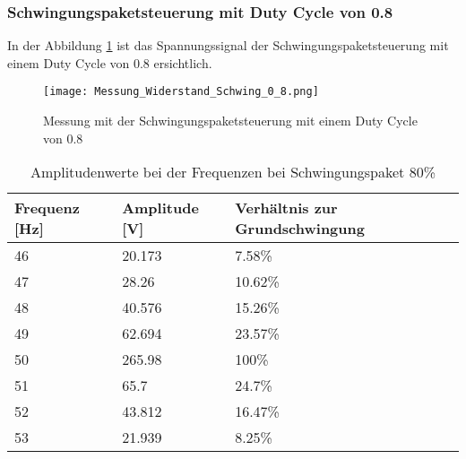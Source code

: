 \newpage
\subsubsection*{Schwingungspaketsteuerung mit Duty Cycle von 0.8}
In der Abbildung \ref{fig:Mess_Schwing_80} ist das Spannungssignal der Schwingungspaketsteuerung mit einem Duty Cycle von 0.8 ersichtlich.
\begin{figure}[ht!]
	\centering
	\texttt{[image: Messung\_Widerstand\_Schwing\_0\_8.png]}	
	\caption{Messung mit der Schwingungspaketsteuerung mit einem Duty Cycle von 0.8}\label{fig:Mess_Schwing_80}
\end{figure}


\begin{table}[ht!]
	\centering
	\begin{tabular}{|l|l|l|}
		\hline
		Frequenz {[}Hz{]} & Amplitude {[}V{]} & Verhältnis zur Grundschwingung \\ \hline
		46                & 20.173            & 7.58\%                         \\ \hline
		47                & 28.26             & 10.62\%                        \\ \hline
		48                & 40.576            & 15.26\%                        \\ \hline
		49                & 62.694            & 23.57\%                        \\ \hline
		50                & 265.98            & 100\%                          \\ \hline
		51                & 65.7              & 24.7\%                         \\ \hline
		52                & 43.812            & 16.47\%                        \\ \hline
		53                & 21.939            & 8.25\%                         \\ \hline
	\end{tabular}
\caption{Amplitudenwerte bei der Frequenzen bei Schwingungspaket 80\%}\label{tab:Mess_Spannung_Schwing_80}
\end{table}

